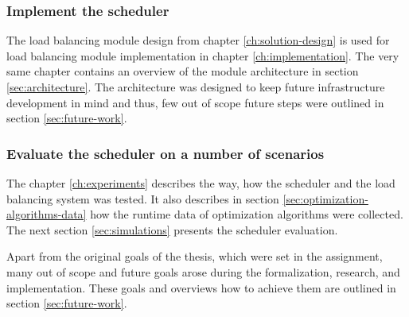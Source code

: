 \subsubsection{Implement the scheduler}
The load balancing module design from chapter \ref{ch:solution-design} is used for 
load balancing module implementation in chapter \ref{ch:implementation}.
The very same chapter contains an overview of the module architecture in section \ref{sec:architecture}.
The architecture was designed to keep future infrastructure development in mind 
and thus, few out of scope future steps were outlined in section \ref{sec:future-work}.

\subsubsection{Evaluate the scheduler on a number of scenarios}
The chapter \ref{ch:experiments} describes the way,
how the scheduler and the load balancing system was tested.
It also describes in section \ref{sec:optimization-algorithms-data} how the runtime data of optimization algorithms were collected.
The next section \ref{sec:simulations} presents the scheduler evaluation.

\bigskip \noindent
Apart from the original goals of the thesis,
which were set in the assignment,
many out of scope and future goals arose during the formalization, research, and implementation.
These goals and overviews how to achieve them are outlined in section \ref{sec:future-work}.
